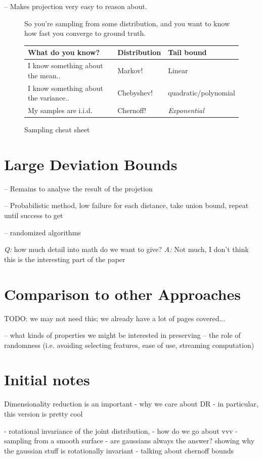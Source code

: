 \documentclass[11pt]{article}
\begin{document}
    -- Makes projection very easy to reason about.

    \begin{figure}[H]
      So you're sampling from some distribution, and you want to know how fast
      you converge to ground truth.

      \begin{tabular}{lll}
        What do you know? & Distribution & Tail bound\\
        \hline
        I know something about the mean..  & Markov! & Linear \\
        I know something about the variance..  & Chebyshev! & quadratic/polynomial\\
        My samples are i.i.d.  & Chernoff! & \emph{Exponential}\\
        \hline
      \end{tabular}
      \caption{Sampling cheat sheet}
      \label{fig:bounds}
    \end{figure}

\section{Large Deviation Bounds}

-- Remains to analyse the result of the projetion

-- Probabilistic method, low failure for each distance, take union bound, repeat
until success to get

-- randomized algorithms

\emph{Q:} how much detail into math do we want to give?
\emph{A:} Not much, I don't think this is the interesting part of the paper


\section{Comparison to other Approaches}
TODO: we may not need this; we already have a lot of pages covered...

-- what kinds of properties we might be interested in preserving
-- the role of randomness (i.e. avoiding selecting features, ease of use, streaming computation)


\section{Initial notes}

Dimensionality reduction is an important 
- why we care about DR
- in particular, this version is pretty cool

- rotational invariance of the joint distribution, 
- how do we go about vvv 
- sampling from a smooth surface
- are gaussians always the answer?
showing why the gaussian stuff is rotationally invariant
- talking about chernoff bounds
{}

\end{document}
